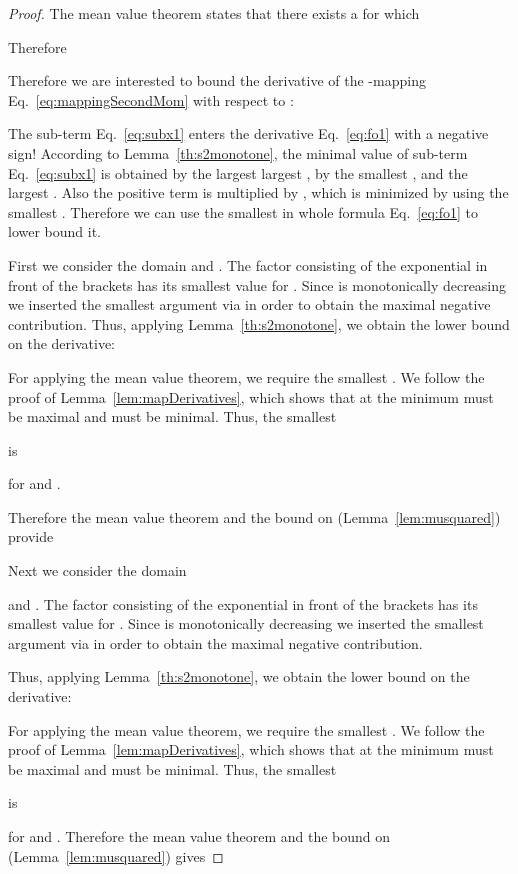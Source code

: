 \documentclass{article}
\begin{document}
\begin{proof}
The mean value theorem states that there exists a   for which

Therefore


Therefore we are interested to bound the derivative of the -mapping
Eq.~\eqref{eq:mappingSecondMom} with respect to  :



The sub-term Eq.~\eqref{eq:subx1} enters the derivative
Eq.~\eqref{eq:fo1} with a negative sign!
According to Lemma~\ref{th:s2monotone},
the minimal value of sub-term Eq.~\eqref{eq:subx1}
is obtained by the largest largest  , 
by the smallest , and the largest .
Also the positive term
 is multiplied by , which is minimized
by using the smallest .
Therefore we can use the smallest   in whole formula
Eq.~\eqref{eq:fo1} to lower bound it. 


First we consider the domain 
  and .
The factor consisting of the exponential in front of the brackets has
its smallest value for .
Since  is monotonically decreasing we inserted the
smallest argument via  in order to obtain the maximal negative contribution.
Thus, applying Lemma~\ref{th:s2monotone}, we obtain the lower bound on the derivative:


For applying the mean value theorem, we require the smallest .
We follow the proof of Lemma~\ref{lem:mapDerivatives}, which shows
that at the minimum  must be maximal 
and  must be minimal.
Thus, the smallest 

is 

for  and .



Therefore the mean value theorem and the bound on  (Lemma~\ref{lem:musquared}) provide



Next we consider the domain 
 
and .
The factor consisting of the exponential in front of the brackets has
its smallest value for . 
Since  is monotonically decreasing we inserted the
smallest argument via  in order to obtain the maximal negative contribution.

Thus, applying Lemma~\ref{th:s2monotone}, we obtain the lower bound on the derivative:


For applying the mean value theorem, we require the smallest .
We follow the proof of Lemma~\ref{lem:mapDerivatives}, which shows
that at the minimum  must be maximal 
and  must be minimal.
Thus, the smallest 

is 

for  and .
Therefore the mean value theorem and the bound on  (Lemma~\ref{lem:musquared}) gives


\end{proof}
\end{document}

